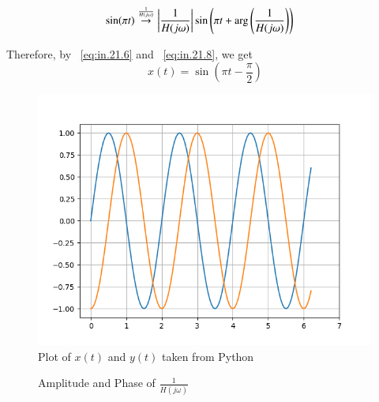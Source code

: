 \documentclass[journal,12pt,twocolumn]{IEEEtran}
\newcommand{\phase}[1]{\text{arg}\left(#1\right)}
\newcommand{\system}[1]{\stackrel{#1}{\rightarrow}}
\theoremstyle{remark}
\begin{document}
\begin{align}
  \sin(\pi t)&\system{\frac{1}{H(j\omega)}}\abs{\frac{1}{H(j\omega)}}\sin\left(\pi t  + \phase{\frac{1}{H(j\omega)}}\right)\label{eq:in.21.8}
\end{align}

Therefore, by ~\eqref{eq:in.21.6} and ~\eqref{eq:in.21.8}, we get
\begin{equation}
    x(t)=\sin\left(\pi t -\frac{\pi}{2}\right)
\end{equation}

\begin{figure}[h]
  \centering
  \includegraphics[width=\columnwidth]{./figs/figure3.png} 
  \captionsetup{justification=centering}
  \caption{Plot of $x(t)$ and $y(t)$ taken from Python}
  \label{fig:in.21.f3}
\end{figure}

\begin{figure}[h]
  \centering

  \hfill
  \caption{Amplitude and Phase of $\frac{1}{H(j\omega)}$}
  \label{fig:in.21.subfig}
\end{figure}
\end{document}
